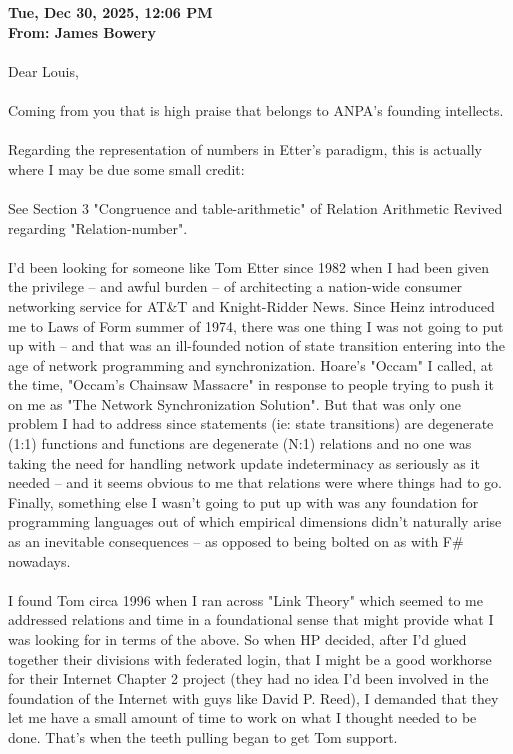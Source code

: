 \documentclass{ws-rv9x6}
\theoremstyle{remark}
\begin{document}
\begin{appendices}
\textbf{Tue, Dec 30, 2025, 12:06 PM \\
From: James Bowery \\}
\\
Dear Louis, \\
\\
Coming from you that is high praise that belongs to ANPA's founding intellects. \\
 \\
Regarding the representation of numbers in Etter's paradigm, this is actually where I may be due some small credit: \\
\\
See Section 3 "Congruence and table-arithmetic" of Relation Arithmetic Revived regarding "Relation-number". \\
\\
I'd been looking for someone like Tom Etter since 1982 when I had been given the privilege -- and awful burden -- of architecting a nation-wide consumer networking service for AT\&T and Knight-Ridder News.  Since Heinz introduced me to Laws of Form summer of 1974, there was one thing I was not going to put up with -- and that was an ill-founded notion of state transition entering into the age of network programming and synchronization.  Hoare's "Occam" I called, at the time, "Occam's Chainsaw Massacre" in response to people trying to push it on me as "The Network Synchronization Solution".  But that was only one problem I had to address since statements (ie: state transitions) are degenerate (1:1) functions and functions are degenerate (N:1) relations and no one was taking the need for handling network update indeterminacy as seriously as it needed -- and it seems obvious to me that relations were where things had to go.  Finally, something else I wasn't going to put up with was any foundation for programming languages out of which empirical dimensions didn't naturally arise as an inevitable consequences -- as opposed to being bolted on as with F# nowadays. \\
\\
I found Tom circa 1996 when I ran across "Link Theory" which seemed to me addressed relations and time in a foundational sense that might provide what I was looking for in terms of the above.  So when HP decided, after I'd glued together their divisions with federated login, that I might be a good workhorse for their Internet Chapter 2 project (they had no idea I'd been involved in the foundation of the Internet with guys like David P. Reed), I demanded that they let me have a small amount of time to work on what I thought needed to be done.  That's when the teeth pulling began to get Tom support. \\

\end{appendices}
\end{document}
